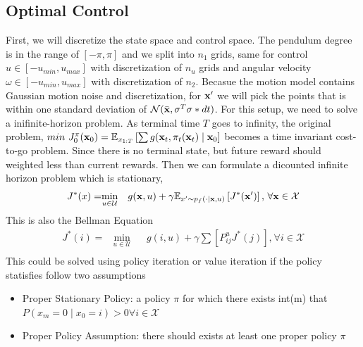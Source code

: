 \documentclass[letterpaper, 10 pt, conference]{ieeeconf}  %
\begin{document}
\subsection{Optimal Control}
First, we will discretize the state space and control space. The pendulum degree is in the range of 
$\left [ -\pi, \pi \right ]$ and we split into $n_1$ grids, same for control $u \in \left [ -u_{min}, u_{max} \right ]$ with 
discretization of $n_u$ grids and angular velocity $\omega \in \left [ -u_{min}, u_{max} \right ]$ with discretization of 
$n_2$. Becasue the motion model contains Gaussian motion noise and discretization, for $\mathbf{x}'$ we will pick the points that 
is within one standard deviation of $\mathcal{N}(\bar{\mathbf{x}}, \sigma^T\sigma*dt)$. For this setup, we need to solve a
inifinite-horizon problem. As terminal time $T$ goes to infinity, the original problem, 
$min \ J^{\pi}_0(\xb_0) = \mathbb{E}_{x_{1:T}}\left [  \sum g(\xb_t, \pi_t(\xb_t) \mid \xb_0 \right]$ becomes a time 
invariant cost-to-go problem. Since there is no terminal state, but future reward should weighted less
than current rewards. Then we can formulate a dicounted infinite horizon problem which is stationary, 
\begin{equation}
    \begin{aligned}
    J^*(x) =
        & \underset{u\in \mathcal{U}}{\text{min}}
        & & g(\mathbf{x}, u) + \gamma \mathbb{E}_{x'\sim p_f(\cdot \mid \mathbf{x}, u)} \left [ J^*(\mathbf{x}') \right ] \text{,} \ \forall \mathbf{x} \in \mathcal{X} \\
    \end{aligned}
\end{equation}
This is also the Bellman Equation
\begin{equation}
    \begin{aligned}
    J^*(i) =
        & \underset{u\in \mathcal{U}}{\text{min}}
        & & g(i, u) + \gamma \sum \left [ P_{ij}^u J^*(j) \right ] \text{,} \ \forall i \in \mathcal{X} \\
    \end{aligned}
\end{equation}
This could be solved using policy iteration or value iteration if the policy statisfies follow two assumptions
\begin{itemize}
    \item Proper Stationary Policy: a policy $\pi$ for which there exists int(m) that $P(x_m = 0 \mid x_0 = i) > 0 \forall i \in
    \mathcal{X}$ 
    \item Proper Policy Assumption: there should exists at least one proper policy $\pi$
  \end{itemize}  
\end{document}
